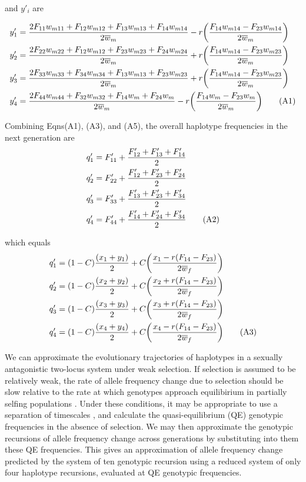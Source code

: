 \documentclass{article}
\newcommand\numberthis{\addtocounter{equation}{1}\tag{\theequation}}
\begin{document}
\noindent{} and $y'_{i}$ are

\begin{align*}
	y'_1 &= \frac{2 F_{11} w_{m11} + F_{12} w_{m12} + F_{13} w_{m13} + F_{14} w_{m14}}{2 \overline{w}_m} - r \bigg( \frac{F_{14} w_{m14} - F_{23} w_{m14}}{2 \overline{w}_m} \bigg) \\
	y'_2 &= \frac{2 F_{22} w_{m22} + F_{12} w_{m12} + F_{23} w_{m23} + F_{24} w_{m24}}{2 \overline{w}_m} + r \bigg( \frac{F_{14} w_{m14} - F_{23} w_{m23}}{2 \overline{w}_m} \bigg) \\
	y'_3 &= \frac{2 F_{33} w_{m33} + F_{34} w_{m34} + F_{13} w_{m13} + F_{23} w_{m23}}{2 \overline{w}_m} + r \bigg( \frac{F_{14} w_{m14} - F_{23} w_{m23}}{2 \overline{w}_m} \bigg) \\
	y'_4 &= \frac{2 F_{44} w_{m44} + F_{32} w_{m32} + F_{14} w_{m} + F_{24} w_{m}}{2 \overline{w}_m} - r \bigg( \frac{F_{14} w_{m} - F_{23} w_{m}}{2 \overline{w}_m} \bigg) \numberthis
\end{align*}


Combining Eqns(A1), (A3), and (A5), the overall haplotype frequencies in the next generation are
\begin{align*}
	q'_1 &= F'_{11} + \frac{F'_{12} + F'_{13} + F'_{14}}{2} \\
	q'_2 &= F'_{22} + \frac{F'_{12} + F'_{23} + F'_{24}}{2} \\
	q'_3 &= F'_{33} + \frac{F'_{13} + F'_{23} + F'_{34}}{2} \\
	q'_4 &= F'_{44} + \frac{F'_{14} + F'_{24} + F'_{34}}{2} \numberthis
\end{align*}

which equals 
\begin{align*}
	q'_1 &= (1 - C) \frac{(x_1 + y_1)}{2} + C \bigg( \frac{x_1 - r(F_{14} - F_{23})}{2 \overline{w}_f} \bigg) \\
	q'_2 &= (1 - C) \frac{(x_2 + y_2)}{2} + C \bigg( \frac{x_2 + r(F_{14} - F_{23})}{2 \overline{w}_f} \bigg) \\
	q'_3 &= (1 - C) \frac{(x_3 + y_3)}{2} + C \bigg( \frac{x_3 + r(F_{14} - F_{23})}{2 \overline{w}_f} \bigg) \\
	q'_4 &= (1 - C) \frac{(x_4 + y_4)}{2} + C \bigg( \frac{x_4 - r(F_{14} - F_{23})}{2 \overline{w}_f} \bigg) \numberthis
\end{align*}




We can approximate the evolutionary trajectories of haplotypes in a sexually antagonistic two-locus system under weak selection. If selection is assumed to be relatively weak, the rate of allele frequency change due to selection should be slow relative to the rate at which genotypes approach equilibirium in partially selfing populations \citep{Nagylaki1997}. Under these conditions, it may be appropriate to use a separation of timescales \citep{OttoDay2007}, and calculate the quasi-equilibrium (QE) genotypic frequencies in the absence of selection. We may then approximate the genotypic recursions of allele frequency change across generations by substituting into them these QE frequencies. This gives an approximation of allele frequency change predicted by the system of ten genotypic recursion using a reduced system of only four haplotype recursions, evaluated at QE genotypic frequencies. 
\end{document}
